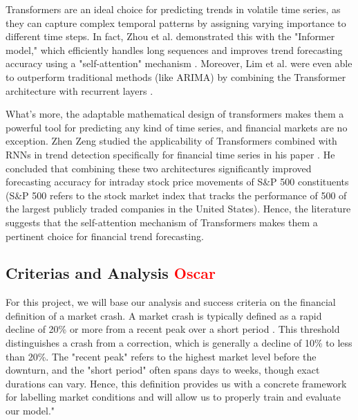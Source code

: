 \documentclass[12pt, letterpaper]{article}
\begin{document}
Transformers are an ideal choice for predicting trends in volatile time series, as they can capture complex temporal patterns by assigning varying importance to different time steps. In fact, Zhou et al. demonstrated this with the "Informer model," which efficiently handles long sequences and improves trend forecasting accuracy using a "self-attention" mechanism \cite{zhou2021informer}. Moreover, Lim et al. were even able to outperform traditional methods (like ARIMA) by combining the Transformer architecture with recurrent layers \cite{lim2021temporal}. 

What's more, the adaptable mathematical design of transformers makes them a powerful tool for predicting any kind of time series, and financial markets are no exception. Zhen Zeng studied the applicability of Transformers combined with RNNs in trend detection specifically for financial time series in his paper \cite{zeng2023financial}. He concluded that combining these two architectures significantly improved forecasting accuracy for intraday stock price movements of S\&P 500 constituents (S\&P 500 refers to the stock market index that tracks the performance of 500 of the largest publicly traded companies in the United States). Hence, the literature suggests that the self-attention mechanism of Transformers makes them a pertinent choice for financial trend forecasting.

\subsection*{Criterias and Analysis \textcolor{red}{Oscar}}
For this project, we will base our analysis and success criteria on the financial definition of a market crash. A market crash is typically defined as a rapid decline of 20\% or more from a recent peak over a short period \cite{Fonville, Investo}. This threshold distinguishes a crash from a correction, which is generally a decline of 10\% to less than 20\%. The "recent peak" refers to the highest market level before the downturn, and the "short period" often spans days to weeks, though exact durations can vary. Hence, this definition provides us with a concrete framework for labelling market conditions and will allow us to properly train and evaluate our model."

\pagebreak
\printbibliography

\end{document}
